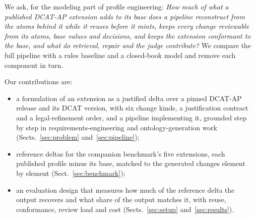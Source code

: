 We ask, for the modeling part of profile engineering: \emph{How much of what a published DCAT-AP extension adds
to its base does a pipeline reconstruct from the atoms behind it while it reuses before it mints, keeps every
change reviewable from its atoms, base values and decisions, and keeps the extension conformant to the base, and
what do retrieval, repair and the judge contribute?} We compare the full pipeline with a rules baseline and a
closed-book model and remove each component in turn.

Our contributions are:
\begin{itemize}
\item a formulation of an extension as a justified delta over a pinned \acs{DCAT-AP} release and its DCAT version,
  with six change kinds, a justification contract and a legal-refinement order, and a pipeline implementing it, %
  grounded step by step in requirements-engineering and ontology-generation work
  (Sects.~\ref{sec:problem} and~\ref{sec:pipeline});
\item reference deltas for the companion benchmark's five extensions, each published profile minus its base, %
  matched to the generated changes element by element (Sect.~\ref{sec:benchmark});
\item an evaluation design that measures how much of the reference delta the output recovers and what share of
  the output matches it, with reuse, conformance, review load and cost (Sects.~\ref{sec:setup}
  and~\ref{sec:results}). 
\end{itemize}
